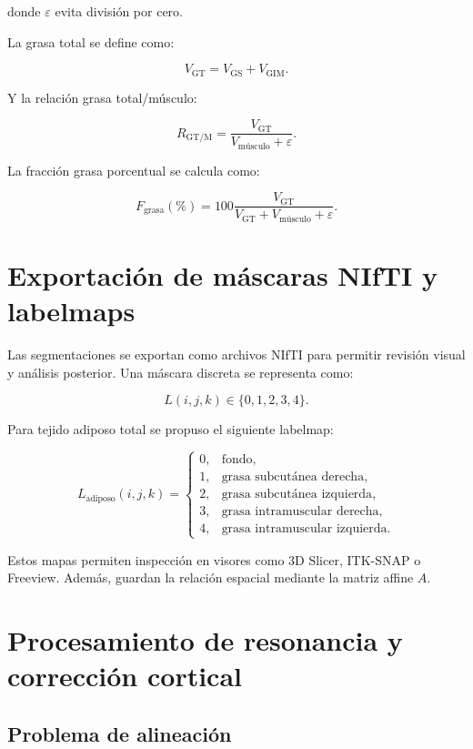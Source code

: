 \documentclass[12pt,a4paper]{article}
\begin{document}
donde \(\varepsilon\) evita división por cero.

La grasa total se define como:

\[
V_{\text{GT}}
=
V_{\text{GS}} + V_{\text{GIM}}.
\]

Y la relación grasa total/músculo:

\[
R_{\text{GT/M}}
=
\frac{V_{\text{GT}}}{V_{\text{músculo}}+\varepsilon}.
\]

La fracción grasa porcentual se calcula como:

\[
F_{\text{grasa}}(\%)=
100
\frac{V_{\text{GT}}}{V_{\text{GT}}+V_{\text{músculo}}+\varepsilon}.
\]

\section{Exportación de máscaras NIfTI y labelmaps}

Las segmentaciones se exportan como archivos NIfTI para permitir revisión visual y análisis posterior. Una máscara discreta se representa como:

\[
L(i,j,k)\in \{0,1,2,3,4\}.
\]

Para tejido adiposo total se propuso el siguiente labelmap:

\[
L_{\text{adiposo}}(i,j,k)=
\begin{cases}
0, & \text{fondo},\\
1, & \text{grasa subcutánea derecha},\\
2, & \text{grasa subcutánea izquierda},\\
3, & \text{grasa intramuscular derecha},\\
4, & \text{grasa intramuscular izquierda}.
\end{cases}
\]

Estos mapas permiten inspección en visores como 3D Slicer, ITK-SNAP o Freeview. Además, guardan la relación espacial mediante la matriz affine \(A\).

\section{Procesamiento de resonancia y corrección cortical}

\subsection{Problema de alineación}
\end{document}
